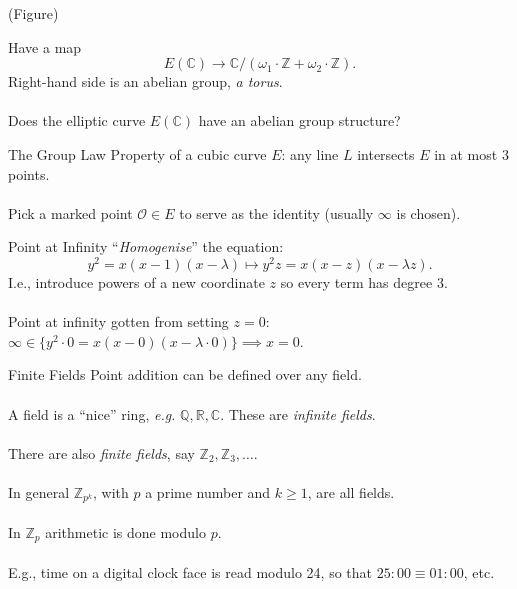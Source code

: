 \documentclass{beamer}
\begin{document}
\begin{frame}	
	(Figure)
\end{frame}

\begin{frame}
	Have a map
	$$
		E(\mathbb{C}) \longrightarrow \mathbb{C}/(\omega_{1}\cdot \mathbb{Z} + \omega_{2}\cdot \mathbb{Z} ).
	$$
	Right-hand side is an abelian group, \emph{a torus}. \\~\\
	
	Does the elliptic curve $E(\mathbb{C})$ have an abelian group structure?
\end{frame}

\begin{frame}[t]{The Group Law}
	Property of a cubic curve $E$: any line $L$ intersects $E$ in at most 3 points. \\~\\ 	
	
	Pick a marked point $\mathcal{O} \in E$ to serve as the identity (usually $\infty$ is chosen).
\end{frame}

\begin{frame}[t]{Point at Infinity}
	``\emph{Homogenise}'' the equation:
	$$
		y^{2} = x(x-1)(x-\lambda) \longmapsto y^{2}z = x(x-z)(x-\lambda z).
	$$
	I.e., introduce powers of a new coordinate $z$ so every term has degree 3. \\~\\
	
	Point at infinity gotten from setting $z = 0$: $\infty \in \big\{ y^{2}\cdot 0 = x(x-0)(x-\lambda\cdot 0) \big\} \implies x = 0$.
\end{frame}

\begin{frame}{Finite Fields}
	Point addition can be defined over any field. \\~\\
	
	A field is a ``nice'' ring, \emph{e.g.} $\mathbb{Q}, \mathbb{R}, \mathbb{C}$. These are \emph{infinite fields}. \\~\\
	
	There are also \emph{finite fields}, say $\mathbb{Z}_{2}, \mathbb{Z}_{3},\ldots$. \\~\\
	
	In general $\mathbb{Z}_{p^{k}}$, with $p$ a prime number and $k\geq 1$, are all fields. \\~\\

	In $\mathbb{Z}_{p}$ arithmetic is done modulo $p$. \\~\\
	
	E.g., time on a digital clock face is read modulo 24, so that $25:00 \equiv 01:00$, etc.
\end{frame}
\end{document}

